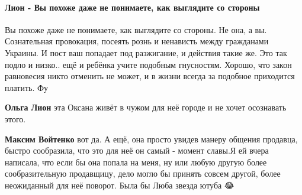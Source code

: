  
 
 
 
 
\paragraph{Лион - Вы похоже даже не понимаете, как выглядите со стороны}
\label{sec:24_07_2021.fb.hvylja_oksana.1.uvolnenie_harkov_kiosk.cmt.lion_ponimanie}

\begin{itemize}
 

Вы похоже даже не понимаете, как выглядите со стороны. Не она, а вы.
Сознательная провокация, посеять рознь и ненависть между гражданами Украины. И
пост ваш попадает под разжигание, и действия такие же. Это так подло и низко..
ещё и ребёнка учите подобным гнусностям. Хорошо, что закон равновесия никто
отменить не может, и в жизни всегда за подобное приходится платить. Фу

\begin{itemize}
 
\textbf{Ольга Лион} эта Оксана живёт в чужом для неё городе и не хочет осознавать этого.

 
\textbf{Максим Войтенко} вот да. А ещё, она просто увидев манеру общения
продавца, быстро сообразила, что это для неё он самый - момент славы.Я ей вчера
написала, что если бы она попала на меня, ну или любую другую более
сообразительную продавщицу, дело могло бы принять совсем другой, более
неожиданный для неё поворот. Была бы Люба звезда ютуба 😂


\end{itemize}
\end{itemize}
